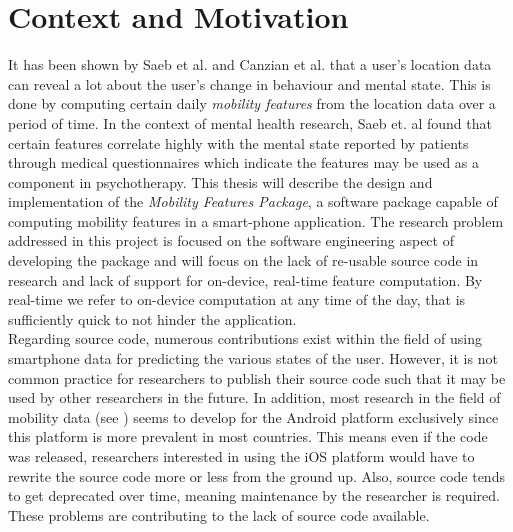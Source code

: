 \section{Context and Motivation}



It has been shown by Saeb et al. and Canzian et al. \cite{Saeb2015, Canzian2015} that a user's location data can reveal a lot about the user's change in behaviour and mental state. This is done by computing certain daily \textit{mobility features} from the location data over a period of time. In the context of mental health research, Saeb et. al \cite{Saeb2015} found that certain features correlate highly with the mental state reported by patients through medical questionnaires which indicate the features may be used as a component in psychotherapy. This thesis will describe the design and implementation of the \textit{Mobility Features Package}, a software package capable of computing mobility features in a smart-phone application. The research problem addressed in this project is focused on the software engineering aspect of developing the package and will focus on the lack of re-usable source code in research and lack of support for on-device, real-time feature computation. By real-time we refer to on-device computation at any time of the day, that is sufficiently quick to not hinder the application.\\

Regarding source code, numerous contributions exist within the field of using smartphone data for predicting the various states of the user. However, it is not common practice for researchers to publish their source code such that it may be used by other researchers in the future. In addition, most research in the field of mobility data (see \cite{Saeb2015, saeb2016, Canzian2015, extraction-of-behavioural-features}) seems to develop for the Android platform exclusively since this platform is more prevalent in most countries. This means even if the code was released, researchers interested in using the iOS platform would have to rewrite the source code more or less from the ground up. Also, source code tends to get deprecated over time, meaning maintenance by the researcher is required. These problems are contributing to the lack of source code available.\\

